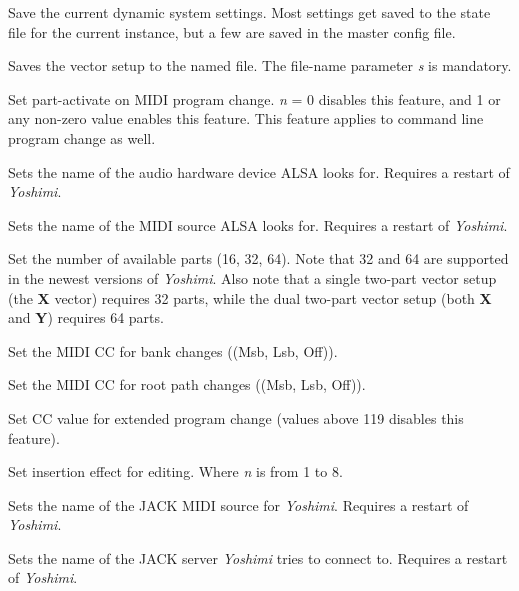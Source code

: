      Save the current dynamic system settings.
      Most settings get saved to the state file for the current instance,
      but a few are saved in the master config file.

      Saves the vector setup to the named file.
      The file-name parameter \textsl{s} is mandatory.

      Set part-activate on MIDI program change.
      \textsl{n} = 0 disables this feature, and
      1 or any non-zero value enables this feature.
      This feature applies to command line program change as well.

      Sets the name of the audio hardware device ALSA looks for.
      Requires a restart of \textsl{Yoshimi}.

      Sets the name of the MIDI source ALSA looks for.
      Requires a restart of \textsl{Yoshimi}.

      Set the number of available parts (16, 32, 64).
      Note that 32 and 64 are supported in the newest versions of
      \textsl{Yoshimi}.  Also note that a single two-part vector setup (the
      \textbf{X} vector) requires 32 parts, while the dual two-part vector
      setup (both \textbf{X} and \textbf{Y}) requires 64 parts.

      Set the MIDI CC for bank changes ((Msb, Lsb, Off)).

      Set the MIDI CC for root path changes ((Msb, Lsb, Off)).

      Set CC value for extended program change (values above 119 disables
      this feature).

      Set insertion effect for editing. Where \textsl{n} is from 1 to 8.

      Sets the name of the JACK MIDI source for \textsl{Yoshimi}.
      Requires a restart of \textsl{Yoshimi}.

      Sets the name of the JACK server \textsl{Yoshimi} tries to connect to.
      Requires a restart of \textsl{Yoshimi}.

